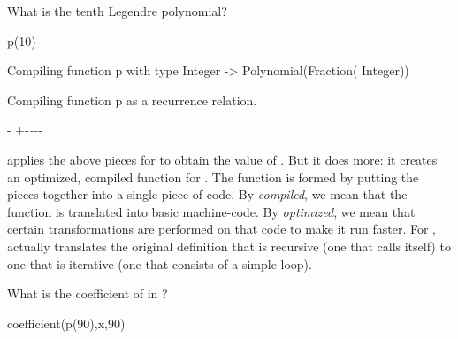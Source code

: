%
\begin{xtc}
\begin{xtccomment}
What is the tenth Legendre polynomial?
\end{xtccomment}
\begin{spadsrc}
p(10)
\end{spadsrc}
\begin{MessageOutput}
   Compiling function p with type Integer -> Polynomial(Fraction(
      Integer)) 
\end{MessageOutput}
\begin{MessageOutput}
   Compiling function p as a recurrence relation.
\end{MessageOutput}
\begin{TeXOutput}
\begin{fricasmath}{4}
\TIMES {}-{\TIMES %
}+\TIMES {}-{\TIMES {}}+\TIMES {}-{}%
\end{fricasmath}
\end{TeXOutput}
\end{xtc}

\Language{} applies the above pieces for
 to obtain the value of .
But it does more:
it creates an optimized, compiled function for .
The function is formed by putting the pieces together into
a single piece of code.
By {\it compiled}, we mean that the function is translated into
basic machine-code.
By {\it optimized}, we mean that certain transformations are
performed on that code to make it run faster.
For , \Language{} actually translates the original definition
that is recursive (one that calls itself)
to one that is iterative (one that consists of a simple loop).

%
\begin{xtc}
\begin{xtccomment}
What is the coefficient of  in ?
\end{xtccomment}
\begin{spadsrc}
coefficient(p(90),x,90)
\end{spadsrc}
\begin{TeXOutput}
\begin{fricasmath}{5}
%
\end{fricasmath}
\end{TeXOutput}
\end{xtc}

